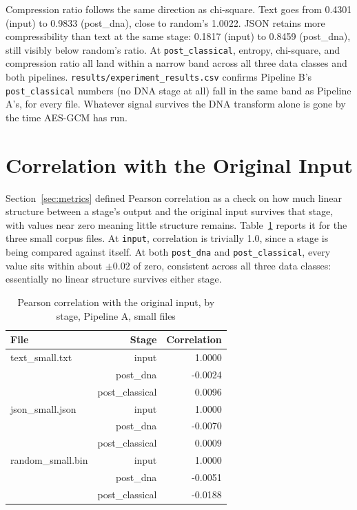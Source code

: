 \documentclass[12pt,a4paper,twoside]{report}
\numberwithin{equation}{chapter}
\begin{document}
Compression ratio follows the same direction as chi-square. Text goes
from 0.4301 (input) to 0.9833 (post\_dna), close to random's 1.0022.
JSON retains more compressibility than text at the same stage: 0.1817
(input) to 0.8459 (post\_dna), still visibly below random's ratio. At
\texttt{post\_classical}, entropy, chi-square, and compression ratio
all land within a narrow band across all three data classes and both
pipelines. \texttt{results/experiment\_results.csv} confirms Pipeline
B's \texttt{post\_classical} numbers (no DNA stage at all) fall in the
same band as Pipeline A's, for every file. Whatever signal survives the
DNA transform alone is gone by the time AES-GCM has run.

\section{Correlation with the Original Input}
\label{sec:results-correlation}
Section~\ref{sec:metrics} defined Pearson correlation as a check on
how much linear structure between a stage's output and the original
input survives that stage, with values near zero meaning little
structure remains. Table~\ref{tab:results-correlation} reports it for
the three small corpus files. At \texttt{input}, correlation is
trivially 1.0, since a stage is being compared against itself. At both
\texttt{post\_dna} and \texttt{post\_classical}, every value sits
within about $\pm 0.02$ of zero, consistent across all three data
classes: essentially no linear structure survives either stage.

\begin{table}[h]
\centering
\caption{Pearson correlation with the original input, by stage, Pipeline A, small files}
\label{tab:results-correlation}
\begin{tabular}{lrr}
\toprule
File & Stage & Correlation \\
\midrule
text\_small.txt & input & 1.0000 \\
 & post\_dna & -0.0024 \\
 & post\_classical & 0.0096 \\
json\_small.json & input & 1.0000 \\
 & post\_dna & -0.0070 \\
 & post\_classical & 0.0009 \\
random\_small.bin & input & 1.0000 \\
 & post\_dna & -0.0051 \\
 & post\_classical & -0.0188 \\
\bottomrule
\end{tabular}
\end{table}
\end{document}
